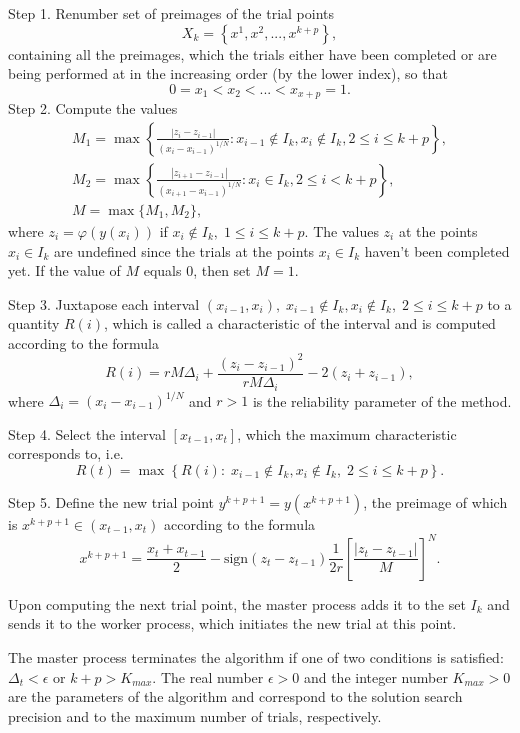 \documentclass{svproc}
\begin{document}
Step 1. Renumber set of preimages of the trial points 
\[
X_k = \left\{x^1, x^2,...,x^{k+p} \right\},
\]
containing all the preimages, which the trials either have been completed or are being performed at in the increasing order (by the lower index), so that
\[
0=x_1<x_2<...<x_{x+p}=1.
\]
Step 2. Compute the values 
\begin{gather*}
M_1=\max \left\{ \frac{ \left|z_i - z_{i-1} \right|}{(x_i-x_{i-1})^{1/N}} : x_{i-1} \notin I_k, x_i \notin I_k, 2\leq i\leq k+p \right\},\\
M_2=\max \left\{ \frac{ \left|z_{i+1} - z_{i-1} \right|}{(x_{i+1}-x_{i-1})^{1/N}} : x_i \in I_k, 2\leq i < k+p \right\},\\
M=\max\{M_1,M_2\},
\end{gather*}
where $z_i=\varphi(y(x_i))$ if $x_i \notin I_k, \; 1\leq i \leq k+p$. The values $z_i$ at the points $x_i \in I_k$ are undefined since the trials at the points $x_i \in I_k$ haven't been completed yet. If the value of $M$ equals 0, then set $M=1$.

Step 3. Juxtapose each interval $(x_{i-1},x_i), \; x_{i-1} \notin I_k, x_i \notin I_k, \; 2\leq i\leq k+p$ to a quantity $R(i)$, which is called a characteristic of the interval and is computed according to the formula
\begin{equation}\label{R}
R(i)=rM\Delta_i+\frac{(z_i-z_{i-1})^2}{rM\Delta_i}-2(z_i+z_{i-1}),
\end{equation}
where $\Delta_i=\left(x_i-x_{i-1}\right)^{1/N}$ and $r>1$ is the reliability parameter of the method.

Step 4. Select the interval $[x_{t-1},x_t]$, which the maximum characteristic corresponds to, i.e.
\[
R(t) = \max \left\{ R(i): \; x_{i-1} \notin I_k, x_i \notin I_k, \; 2\leq i\leq k+p \right\}.
\]

Step 5. Define the new trial point $y^{k+p+1}=y(x^{k+p+1})$, the preimage of which is $x^{k+p+1} \in (x_{t-1},x_t)$ according to the formula
\[
x^{k+p+1} = \frac{x_{t}+x_{t-1}}{2} - \mathrm{sign}(z_{t}-z_{t-1})\frac{1}{2r}\left[\frac{\left|z_{t}-z_{t-1}\right|}{M}\right]^N.
\]

Upon computing the next trial point, the master process adds it to the set $I_k$ and sends it to the worker process, which initiates the new trial at this point. 

The master process terminates the algorithm if one of two conditions is satisfied: $\Delta_{t}<\epsilon$ or $k+p>K_{max}$.
The real number $\epsilon>0$ and the integer number $K_{max}>0$ are the parameters of the algorithm and correspond to the solution search precision and to the maximum number of trials, respectively.
\end{document}
